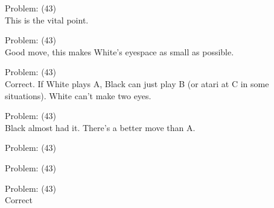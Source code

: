 \documentclass[11pt]{article}
\begin{document}
\begin{minipage}[t]{0.5\textwidth}
  {\centering
  
Problem: (43)\\
This is the vital point.\\
  }
\end{minipage}
\begin{minipage}[t]{0.5\textwidth}
  {\centering
  
Problem: (43)\\
Good move, this makes White's eyespace as small as possible.\\
  }
\end{minipage}
\begin{minipage}[t]{0.5\textwidth}
  {\centering
  
Problem: (43)\\
Correct. If White plays A, Black can just play B (or atari at C in some situations). White can't make two eyes.\\
  }
\end{minipage}
\begin{minipage}[t]{0.5\textwidth}
  {\centering
  
Problem: (43)\\
Black almost had it. There's a better move than A.\\
  }
\end{minipage}
\begin{minipage}[t]{0.5\textwidth}
  {\centering
  
Problem: (43)\\
  }
\end{minipage}
\begin{minipage}[t]{0.5\textwidth}
  {\centering
  
Problem: (43)\\
  }
\end{minipage}
\begin{minipage}[t]{0.5\textwidth}
  {\centering
  
Problem: (43)\\
Correct\\
  }
\end{minipage}
\end{document}
